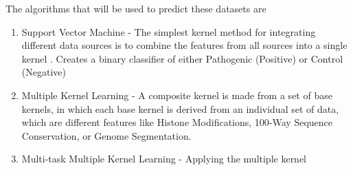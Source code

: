 \documentclass[11pt]{article}
\begin{document}
The algorithms that will be used to predict these datasets are
\begin{enumerate}
	\item Support Vector Machine - The simplest kernel method for integrating different data sources is to combine the features from all sources into a single kernel \cite{Rogers2017}. Creates a binary classifier of either Pathogenic (Positive) or Control (Negative)
	\item Multiple Kernel Learning - A composite kernel is made from a set of base kernels, in which each base kernel is derived from an individual set of data, which are different features like Histone Modifications, 100-Way Sequence Conservation, or Genome Segmentation.
	\item Multi-task Multiple Kernel Learning - Applying the multiple kernel 
\end{enumerate}
\end{document}
